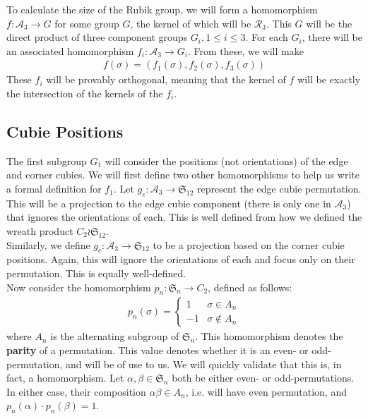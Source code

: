 \documentclass[10pt,letterpaper]{report}
\begin{document}
To calculate the size of the Rubik group, we will form a homomorphism $f : \mathcal{A}_3 \rightarrow G$ for some group $G$, the kernel of which will be $\mathcal{R}_3$.  This $G$ will be the direct product of three component groups $G_i, 1 \leq i \leq 3$.  For each $G_i$, there will be an associated homomorphism $f_i : \mathcal{A}_3 \rightarrow G_i$.  From these, we will make \begin{align*}
f(\sigma) = (f_1(\sigma), f_2(\sigma), f_3(\sigma))
\end{align*}
These $f_i$ will be provably orthogonal, meaning that the kernel of $f$ will be exactly the intersection of the kernels of the $f_i$.

\subsection{Cubie Positions}

The first subgroup $G_1$ will consider the positions (not orientations) of the edge and corner cubies.  We will first define two other homomorphisms to help us write a formal definition for $f_1$.  Let $g_e : \mathcal{A}_3 \rightarrow \mathfrak{S}_{12}$ represent the edge cubie permutation.  This will be a projection to the edge cubie component (there is only one in $\mathcal{A}_3$) that ignores the orientations of each.  This is well defined from how we defined the wreath product $C_2 \wr \mathfrak{S}_{12}$. \\

Similarly, we define $g_c : \mathcal{A}_3 \rightarrow \mathfrak{S}_{12}$ to be a projection based on the corner cubie positions.  Again, this will ignore the orientations of each and focus only on their permutation.  This is equally well-defined. \\

Now consider the homomorphism $p_n : \mathfrak{S}_n \rightarrow C_2$, defined as follows: \begin{align*}
p_n(\sigma) = \begin{cases}
1 & \sigma \in A_n \\
-1 & \sigma \notin A_n
\end{cases}
\end{align*}
where $A_n$ is the alternating subgroup of $\mathfrak{S}_n$.  This homomorphism denotes the \textbf{parity} of a permutation.  This value denotes whether it is an even- or odd-permutation, and will be of use to us.  We will quickly validate that this is, in fact, a homomorphism.  Let $\alpha, \beta \in \mathfrak{S}_n$ both be either even- or odd-permutations.  In either case, their composition $\alpha \beta \in A_n$, i.e. will have even permutation, and $p_n(\alpha) \cdot p_n(\beta) = 1$. \\
\end{document}
